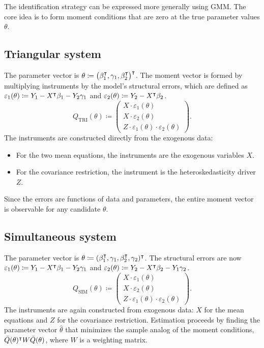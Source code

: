 The identification strategy can be expressed more generally using
GMM. The core idea is to form moment conditions that are zero at the
true parameter values $\theta$.

\subsection{Triangular system}

The parameter vector is $\theta\coloneqq\bigl(\beta_{1}^{\intercal},\gamma_{1},\beta_{2}^{\intercal}\bigr)^{\intercal}$.
The moment vector is formed by multiplying instruments by the model's
structural errors, which are defined as $\varepsilon_{1}(\theta)\coloneqq Y_{1}-X^{\intercal}\beta_{1}-Y_{2}\gamma_{1}$
and $\varepsilon_{2}(\theta)\coloneqq Y_{2}-X^{\intercal}\beta_{2}$.
\begin{equation}
Q_{\text{TRI}}(\theta)\coloneqq\begin{pmatrix}X\cdot\varepsilon_{1}(\theta)\\[3pt]
X\cdot\varepsilon_{2}(\theta)\\[3pt]
Z\cdot\varepsilon_{1}(\theta)\cdot\varepsilon_{2}(\theta)
\end{pmatrix}.\label{eq:moment_tri}
\end{equation}
The instruments are constructed directly from the exogenous data:
\begin{itemize}
\itemsep0pt
\item For the two mean equations, the instruments are the exogenous variables
$X$.
\item For the covariance restriction, the instrument is the heteroskedasticity
driver $Z$.
\end{itemize}
Since the errors are functions of data and parameters, the entire
moment vector is observable for any candidate $\theta$.

\subsection{Simultaneous system}\label{subsec:sys}

The parameter vector is $\theta\coloneqq(\beta_{1}^{\intercal},\gamma_{1},\beta_{2}^{\intercal},\gamma_{2})^{\intercal}$.
The structural errors are now $\varepsilon_{1}(\theta)\coloneqq Y_{1}-X^{\intercal}\beta_{1}-Y_{2}\gamma_{1}$
and $\varepsilon_{2}(\theta)\coloneqq Y_{2}-X^{\intercal}\beta_{2}-Y_{1}\gamma_{2}$.
\begin{equation}
Q_{\text{SIM}}(\theta)\coloneqq\begin{pmatrix}X\cdot\varepsilon_{1}(\theta)\\[3pt]
X\cdot\varepsilon_{2}(\theta)\\[3pt]
Z\cdot\varepsilon_{1}(\theta)\cdot\varepsilon_{2}(\theta)
\end{pmatrix}.\label{eq:moment_sim}
\end{equation}
The instruments are again constructed from exogenous data: $X$ for
the mean equations and $Z$ for the covariance restriction. Estimation
proceeds by finding the parameter vector $\hat{\theta}$ that minimizes
the sample analog of the moment conditions, $\bar{Q}(\theta)^{\intercal} W\bar{Q}(\theta)$,
where $W$ is a weighting matrix.

